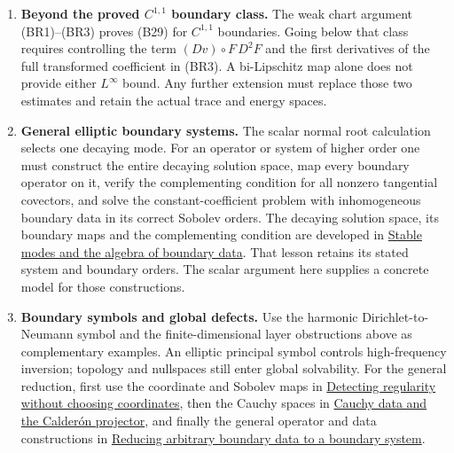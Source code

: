 \documentclass[
  11pt,
]{article}
\providecommand{\tightlist}{%
  \setlength{\itemsep}{0pt}\setlength{\parskip}{0pt}}
\begin{document}
\begin{enumerate}
\def\labelenumi{\arabic{enumi}.}
\tightlist
\item
  \textbf{Beyond the proved \(C^{1,1}\) boundary class.} The weak chart
  argument (BR1)--(BR3) proves (B29) for \(C^{1,1}\) boundaries. Going
  below that class requires controlling the term \((Dv)\circ F\,D^2F\)
  and the first derivatives of the full transformed coefficient in
  (BR3). A bi-Lipschitz map alone does not provide either \(L^\infty\)
  bound. Any further extension must replace those two estimates and
  retain the actual trace and energy spaces.
\item
  \textbf{General elliptic boundary systems.} The scalar normal root
  calculation selects one decaying mode. For an operator or system of
  higher order one must construct the entire decaying solution space,
  map every boundary operator on it, verify the complementing condition
  for all nonzero tangential covectors, and solve the
  constant-coefficient problem with inhomogeneous boundary data in its
  correct Sobolev orders. The decaying solution space, its boundary maps
  and the complementing condition are developed in
  \href{stable-boundary-models.pdf}{Stable modes and the algebra of
  boundary data}. That lesson retains its stated system and boundary
  orders. The scalar argument here supplies a concrete model for those
  constructions.
\item
  \textbf{Boundary symbols and global defects.} Use the harmonic
  Dirichlet-to-Neumann symbol and the finite-dimensional layer
  obstructions above as complementary examples. An elliptic principal
  symbol controls high-frequency inversion; topology and nullspaces
  still enter global solvability. For the general reduction, first use
  the coordinate and Sobolev maps in
  \href{geometric-microlocal-calculus.pdf}{Detecting regularity without
  choosing coordinates}, then the Cauchy spaces in
  \href{calderon-cauchy-data.pdf}{Cauchy data and the Calderón
  projector}, and finally the general operator and data constructions in
  \href{arbitrary-boundary-data-reduction.pdf}{Reducing arbitrary
  boundary data to a boundary system}.
\end{enumerate}
\end{document}
